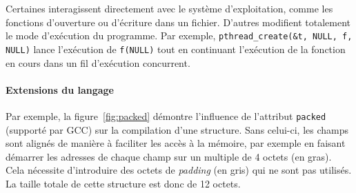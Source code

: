 Certaines interagissent directement avec le système d'exploitation, comme les
fonctions d'ouverture ou d'écriture dans un fichier. D'autres modifient
totalement le mode d'exécution du programme. Par exemple,
\texttt{pthread\_create(\&t, NULL, f, NULL)} lance l'exécution de
\texttt{f(NULL)} tout en continuant l'exécution de la fonction en cours
dans un fil d'exécution concurrent.

\paragraph{Extensions du langage}

Par exemple, la figure~\ref{fig:packed} démontre l'influence de l'attribut
\texttt{packed} (supporté par GCC) sur la compilation d'une structure. Sans
celui-ci, les champs sont alignés de manière à faciliter les accès à la mémoire,
par exemple en faisant démarrer les adresses de chaque champ sur un multiple de
4 octets (en gras). Cela nécessite d'introduire des octets de \emph{padding} (en
gris) qui ne sont pas utilisés. La taille totale de cette structure est donc de
12 octets.

